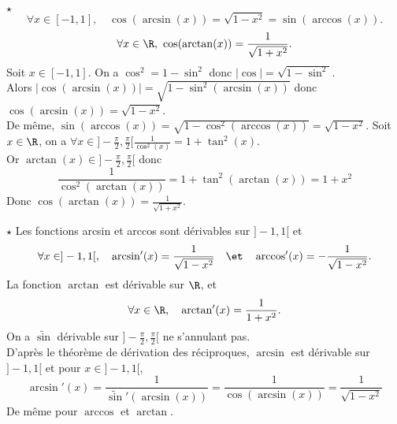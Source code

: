 \documentclass[11pt]{article}
\begin{document}
\begin{lemme}{$\star$}{}
    \begin{equation*}
        \forall x\in[-1,1],\quad\cos(\arcsin(x))=\sqrt{1-x^2}=\sin(\arccos(x)).
    \end{equation*}
    \begin{equation*}
        \forall x\in\R,~\cos(\arctan(x))=\frac{1}{\sqrt{1+x^2}}.
    \end{equation*}
    \tcblower
    Soit $x\in[-1,1]$. On a $\cos^2=1-\sin^2$ donc $|\cos|=\sqrt{1-\sin^2}$.\\
    Alors $|\cos(\arcsin(x))|=\sqrt{1-\sin^2(\arcsin(x))}$ donc $\cos(\arcsin(x))=\sqrt{1-x^2}$.\\
    De même, $\sin(\arccos(x))=\sqrt{1-\cos^2(\arccos(x))}=\sqrt{1-x^2}$.\n
    Soit $x\in\R$, on a $\forall x\in]-\frac{\pi}{2},\frac{\pi}{2}[ \frac{1}{\cos^2(x)}=1+\tan^2(x)$.\\
    Or $\arctan(x)\in]-\frac{\pi}{2},\frac{\pi}{2}[$ donc
    \begin{equation*}
        \frac{1}{\cos^2(\arctan(x))}=1+\tan^2(\arctan(x))=1+x^2
    \end{equation*}
    Donc $\cos(\arctan(x))=\frac{1}{\sqrt{1+x^2}}$.
\end{lemme}

\begin{prop}{$\star$}{}
    Les fonctions arcsin et arccos sont dérivables sur $]-1,1[$ et
    \begin{equation*}
        \forall x\in]-1,1[,\quad\arcsin'(x)=\frac{1}{\sqrt{1-x^2}}\quad\et\quad\arccos'(x)=-\frac{1}{\sqrt{1-x^2}}.
    \end{equation*}
    La fonction $\arctan$ est dérivable sur $\R$, et
    \begin{equation*}
        \forall x\in\R,\quad\arctan'(x)=\frac{1}{1+x^2}.
    \end{equation*}
    \tcblower
    On a $\tilde{\sin}$ dérivable sur $]-\frac{\pi}{2},\frac{\pi}{2}[$ ne s'annulant pas.\\
    D'après le théorème de dérivation des réciproques, $\arcsin$ est dérivable sur $]-1,1[$ et pour $x\in]-1,1[$,
    \begin{equation*}
        \arcsin'(x)=\frac{1}{\tilde{\sin}'(\arcsin(x))}=\frac{1}{\cos(\arcsin(x))}=\frac{1}{\sqrt{1-x^2}}
    \end{equation*}
    De même pour $\arccos$ et $\arctan$.
\end{prop}
\end{document}
